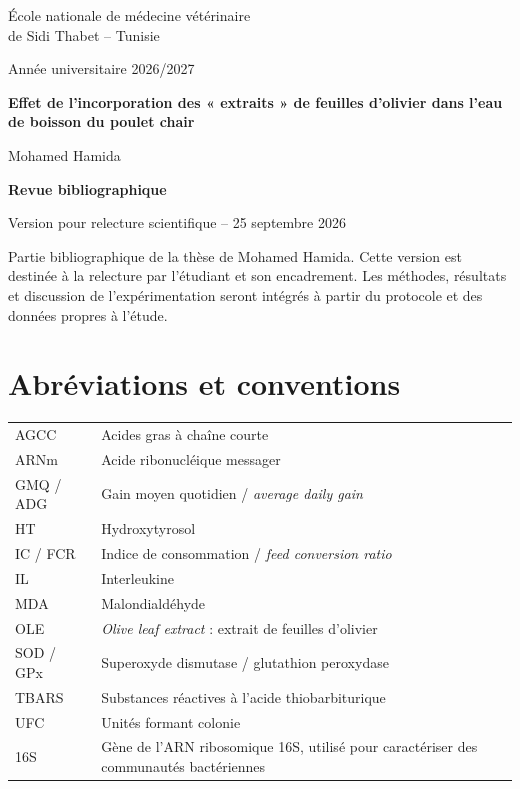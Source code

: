 \documentclass[11pt,a4paper]{article}
\newcommand{\titrethese}{Effet de l'incorporation des « extraits » de feuilles d'olivier dans l'eau de boisson du poulet chair}
\begin{document}
\hypersetup{pageanchor=false}
\begin{titlepage}
\centering
{\large École nationale de médecine vétérinaire\\de Sidi Thabet -- Tunisie\par}
\vspace{1.3cm}
{\large Année universitaire 2026/2027\par}
\vspace{1.5cm}
{\LARGE\bfseries \titrethese\par}
\vspace{1.4cm}
{\Large Mohamed Hamida\par}
\vspace{1.4cm}
{\Large\bfseries Revue bibliographique\par}
\vspace{0.3cm}
{\large Version pour relecture scientifique -- 25 septembre 2026\par}
\vfill
\begin{minipage}{0.89\textwidth}
\small
Partie bibliographique de la thèse de Mohamed Hamida. Cette version est destinée à la relecture par l'étudiant et son encadrement. Les méthodes, résultats et discussion de l'expérimentation seront intégrés à partir du protocole et des données propres à l'étude.
\end{minipage}
\vspace{0.8cm}
\end{titlepage}
\hypersetup{pageanchor=true}
{\small\tableofcontents}
\clearpage
\section*{Abréviations et conventions}
\begin{tabular}{@{}p{2.3cm}p{12.6cm}@{}}
AGCC & Acides gras à chaîne courte\\
ARNm & Acide ribonucléique messager\\
GMQ / ADG & Gain moyen quotidien / \textit{average daily gain}\\
HT & Hydroxytyrosol\\
IC / FCR & Indice de consommation / \textit{feed conversion ratio}\\
IL & Interleukine\\
MDA & Malondialdéhyde\\
OLE & \textit{Olive leaf extract} : extrait de feuilles d'olivier\\
SOD / GPx & Superoxyde dismutase / glutathion peroxydase\\
TBARS & Substances réactives à l'acide thiobarbiturique\\
UFC & Unités formant colonie\\
16S & Gène de l'ARN ribosomique 16S, utilisé pour caractériser des communautés bactériennes\\
\end{tabular}
\end{document}
